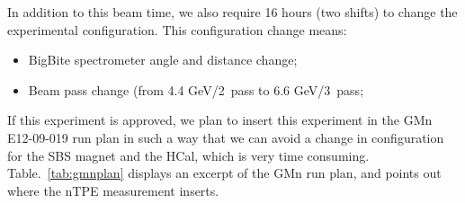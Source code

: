 In addition to this beam time, we also require 16 hours (two shifts) to change the experimental configuration.
This configuration change means:
%
\begin{itemize}
\item{BigBite spectrometer angle and distance change;}
\item{Beam pass change (from 4.4 GeV/2~pass to 6.6 GeV/3~pass;}
\end{itemize}
%
If this experiment is approved, we plan to insert this experiment in the GMn E12-09-019 run plan in such a way that we can avoid a change in configuration for the SBS magnet and the HCal, which is very time consuming. Table.~\ref{tab:gmnplan} displays an excerpt of the GMn run plan, and points out where the nTPE measurement inserts. 
%
